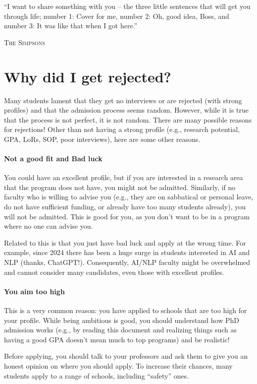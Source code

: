 \documentclass[oneside,11pt,dvipsnames]{book}
\begin{document}
\epigraph{``I want to share something with you – the three little sentences that will get you through life; number 1: Cover for me, number 2: Oh, good idea, Boss, and number 3: It was like that when I got here.''}{\textsc{The Simpsons}}

\section{Why did I get rejected?}\label{sec:why-rejected}

Many students lament that they get no interviews or are rejected (with strong profiles) and that the admission process seems random.  However, while it is true that the process is not perfect, it is not random.
There are many possible reasons for rejections!  Other than not having a strong profile (e.g., research potential, GPA, LoRs, SOP, poor interviews), here are some other reasons.


\paragraph{Not a good fit and Bad luck}  You could have an excellent profile, but if you are interested in a research area that the program does not have, you might not be admitted.
Similarly, if no faculty who is willing to advise you (e.g., they are on sabbatical or personal leave, do not have sufficient funding, or already have too many students already), you will not be admitted.  This is good for you, as you don't want to be in a program where no one can advise you.

Related to this is that you just have bad luck and apply at the wrong time.  For example, since 2024 there has been a huge surge in students interested in AI and NLP (thanks, ChatGPT!). Consequently, AI/NLP faculty might be overwhelmed and cannot consider many candidates, even those with excellent profiles.


\paragraph{You aim too high} This is a very common reason: you have applied to schools that are too high for your profile. While being ambitious is good, you should understand how PhD admission works (e.g., by reading this document and realizing things such as having a good GPA doesn't mean much to top programs) and be realistic! 

Before applying, you should talk to your professors and ask them to give you an honest opinion on where you should apply. To increase their chances, many students apply to a range of schools, including ``safety'' ones. 
\end{document}
